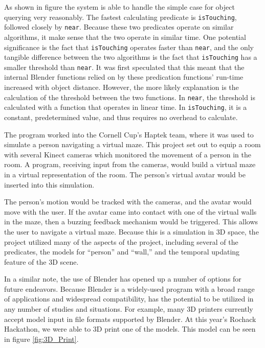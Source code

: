 As shown in figure the system is able to handle the simple case for object querying very reasonably. 
The fastest calculating predicate is \texttt{isTouching}, followed closely by \texttt{near}.
Because these two predicates operate on similar algorithms, it make sense that the two operate in similar time.
One potential significance is the fact that \texttt{isTouching} operates faster than \texttt{near}, and the only tangible difference between the two algorithms is the fact that \texttt{isTouching} has a smaller threshold than \texttt{near}.
It was first speculated that this meant that the internal Blender functions relied on by these predication functions' run-time increased with object distance.
However, the more likely explanation is the calculation of the threshold between the two functions.
In \texttt{near}, the threshold is calculated with a function that operates in linear time.
In \texttt{isTouching}, it is a constant, predetermined value, and thus requires no overhead to calculate.

The program worked into the Cornell Cup's Haptek team, where it was used to simulate a person navigating a virtual maze.  
This project set out to equip a room with several Kinect cameras which monitored the movement of a person in the room. A program, receiving input from the cameras, would build a virtual maze in a virtual representation of the room. The person's virtual avatar would be inserted into this simulation. 

The person's motion would be tracked with the cameras, and the avatar would move with the user. If the avatar came into contact with one of the virtual walls in the maze, then a buzzing feedback mechanism would be triggered. This allows the user to navigate a virtual maze. Because this is a simulation in 3D space, the project utilized many of the aspects of the \TDS project, including several of the predicates, the models for ``person'' and ``wall,'' and the temporal updating feature of the 3D scene.

In a similar note, the use of Blender has opened up a number of options for future endeavors. Because Blender is a widely-used program with a broad range of applications and widespread compatibility, \TDS has the potential to be utilized in any number of studies and situations. For example, many 3D printers currently accept model input in file formats supported by Blender. At this year's Rochack Hackathon, we were able to 3D print one of the models. This model can be seen in figure \ref{fig:3D_Print}.



